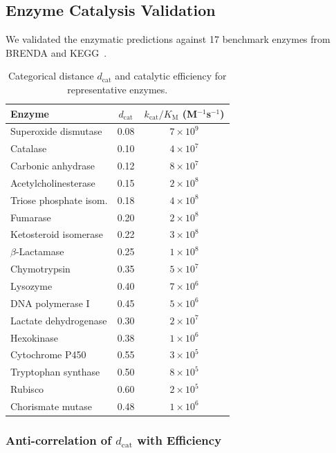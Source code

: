 \documentclass[10pt,twocolumn]{article}
\theoremstyle{definition}
\theoremstyle{remark}
\newcommand{\dcat}{d_{\mathrm{cat}}}
\newcommand{\kcat}{k_{\mathrm{cat}}}
\newcommand{\KM}{K_{\mathrm{M}}}
\begin{document}
\subsection{Enzyme Catalysis Validation}

We validated the enzymatic predictions against 17 benchmark
enzymes from BRENDA and KEGG~\cite{Kanehisa2000,BarEven2011}.

\begin{table}[t]
\centering
\caption{Categorical distance $\dcat$ and catalytic efficiency
for representative enzymes.}
\label{tab:enzymes}
\small
\begin{tabular}{@{}lcc@{}}
\toprule
Enzyme & $\dcat$ & $\kcat/\KM$ (M$^{-1}$s$^{-1}$) \\
\midrule
Superoxide dismutase  & 0.08 & $7 \times 10^{9}$  \\
Catalase              & 0.10 & $4 \times 10^{7}$  \\
Carbonic anhydrase    & 0.12 & $8 \times 10^{7}$  \\
Acetylcholinesterase  & 0.15 & $2 \times 10^{8}$  \\
Triose phosphate isom.& 0.18 & $4 \times 10^{8}$  \\
Fumarase              & 0.20 & $2 \times 10^{8}$  \\
Ketosteroid isomerase & 0.22 & $3 \times 10^{8}$  \\
$\beta$-Lactamase     & 0.25 & $1 \times 10^{8}$  \\
Chymotrypsin          & 0.35 & $5 \times 10^{7}$  \\
Lysozyme              & 0.40 & $7 \times 10^{6}$  \\
DNA polymerase I      & 0.45 & $5 \times 10^{6}$  \\
Lactate dehydrogenase & 0.30 & $2 \times 10^{7}$  \\
Hexokinase            & 0.38 & $1 \times 10^{6}$  \\
Cytochrome P450       & 0.55 & $3 \times 10^{5}$  \\
Tryptophan synthase   & 0.50 & $8 \times 10^{5}$  \\
Rubisco               & 0.60 & $2 \times 10^{5}$  \\
Chorismate mutase     & 0.48 & $1 \times 10^{6}$  \\
\bottomrule
\end{tabular}
\end{table}

\subsubsection{Anti-correlation of $\dcat$ with Efficiency}
\end{document}
